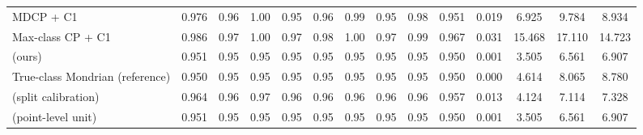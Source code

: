 \begin{table}[!htbp]
{\begin{tabular}{lccccccccccccc}
MDCP + C1 & 0.976 & 0.96 & 1.00 & 0.95 & 0.96 & 0.99 & 0.95 & 0.98 & 0.951 & 0.019 & 6.925 & 9.784 & 8.934 \\
Max-class CP + C1 & 0.986 & 0.97 & 1.00 & 0.97 & 0.98 & 1.00 & 0.97 & 0.99 & 0.967 & 0.031 & 15.468 & 17.110 & 14.723 \\
\gamut{} (ours) & 0.951 & 0.95 & 0.95 & 0.95 & 0.95 & 0.95 & 0.95 & 0.95 & 0.950 & 0.001 & 3.505 & 6.561 & 6.907 \\
True-class Mondrian (reference) & 0.950 & 0.95 & 0.95 & 0.95 & 0.95 & 0.95 & 0.95 & 0.95 & 0.950 & 0.000 & 4.614 & 8.065 & 8.780 \\
\gamut{} (split calibration) & 0.964 & 0.96 & 0.97 & 0.96 & 0.96 & 0.96 & 0.96 & 0.96 & 0.957 & 0.013 & 4.124 & 7.114 & 7.328 \\
\gamut{} (point-level unit) & 0.951 & 0.95 & 0.95 & 0.95 & 0.95 & 0.95 & 0.95 & 0.95 & 0.950 & 0.001 & 3.505 & 6.561 & 6.907 \\
\bottomrule
\end{tabular}}
\end{table}

